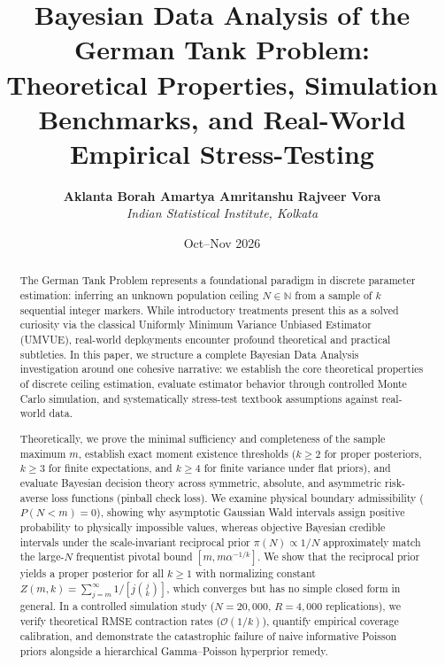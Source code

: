 \documentclass[10pt,a4paper]{article}
\title{\textbf{\Large Bayesian Data Analysis of the German Tank Problem:}\\
\large Theoretical Properties, Simulation Benchmarks, and Real-World Empirical Stress-Testing}
\author{\textbf{Aklanta Borah \qquad Amartya Amritanshu \qquad Rajveer Vora} \\
\textit{Indian Statistical Institute, Kolkata}}
\date{Oct--Nov 2026}
\begin{document}
\maketitle

\begin{abstract}
The German Tank Problem represents a foundational paradigm in discrete parameter estimation: inferring an unknown population ceiling $N \in \mathbb{N}$ from a sample of $k$ sequential integer markers. While introductory treatments present this as a solved curiosity via the classical Uniformly Minimum Variance Unbiased Estimator (UMVUE), real-world deployments encounter profound theoretical and practical subtleties. In this paper, we structure a complete Bayesian Data Analysis~\cite{gelman2013} investigation around one cohesive narrative: we establish the core theoretical properties of discrete ceiling estimation, evaluate estimator behavior through controlled Monte Carlo simulation, and systematically stress-test textbook assumptions against real-world data. 

Theoretically, we prove the minimal sufficiency and completeness of the sample maximum $m$, establish exact moment existence thresholds ($k \ge 2$ for proper posteriors, $k \ge 3$ for finite expectations, and $k \ge 4$ for finite variance under flat priors), and evaluate Bayesian decision theory across symmetric, absolute, and asymmetric risk-averse loss functions (pinball check loss). We examine physical boundary admissibility ($P(N < m) = 0$), showing why asymptotic Gaussian Wald intervals assign positive probability to physically impossible values, whereas objective Bayesian credible intervals under the scale-invariant reciprocal prior $\pi(N)\propto 1/N$ approximately match the large-$N$ frequentist pivotal bound $[m,m\alpha^{-1/k}]$. We show that the reciprocal prior yields a proper posterior for all $k\ge 1$ with normalizing constant $Z(m,k)=\sum_{j=m}^{\infty}1/[j\binom{j}{k}]$, which converges but has no simple closed form in general. In a controlled simulation study ($N = 20,000$, $R = 4,000$ replications), we verify theoretical RMSE contraction rates ($\mathcal{O}(1/k)$), quantify empirical coverage calibration, and demonstrate the catastrophic failure of naive informative Poisson priors alongside a hierarchical Gamma--Poisson hyperprior remedy. 


\end{abstract}
\end{document}
